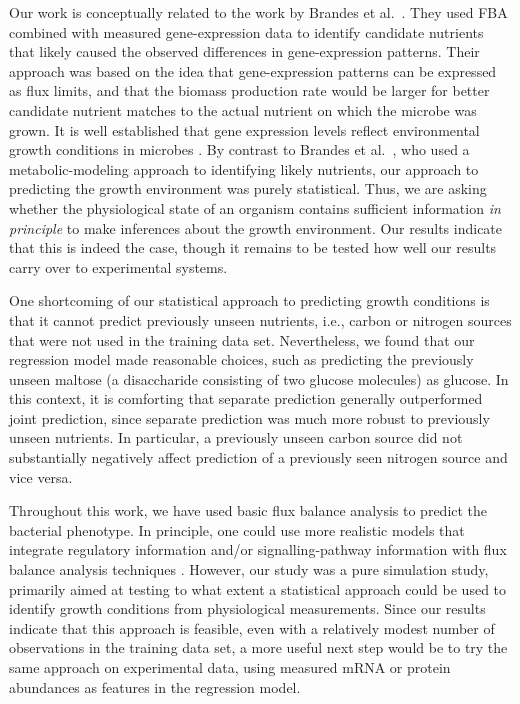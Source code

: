 \documentclass[12pt]{article}
\begin{document}
Our work is conceptually related to the work by Brandes et al.~\cite{Brandesetal2012}. They used FBA combined with measured gene-expression data to identify candidate nutrients that likely caused the observed differences in gene-expression patterns. Their approach was based on the idea that gene-expression patterns can be expressed as flux limits, and that the biomass production rate would be larger for better candidate nutrient matches to the actual nutrient on which the microbe was grown. It is well established that gene expression levels reflect environmental growth conditions in microbes \cite{Schnappingeretal2003,Baevetal2006}. By contrast to Brandes et al.~\cite{Brandesetal2012}, who used a metabolic-modeling approach to identifying likely nutrients, our approach to predicting the growth environment was purely statistical. Thus, we are asking whether the physiological state of an organism contains sufficient information \emph{in principle} to make inferences about the growth environment. Our results indicate that this is indeed the case, though it remains to be tested how well our results carry over to experimental systems.

One shortcoming of our statistical approach to predicting growth conditions is that it cannot predict previously unseen nutrients, i.e., carbon or nitrogen sources that were not used in the training data set. Nevertheless, we found that our regression model made reasonable choices, such as predicting the previously unseen maltose (a disaccharide consisting of two glucose molecules) as glucose. In this context, it is comforting that separate prediction generally outperformed joint prediction, since separate prediction was much more robust to previously unseen nutrients. In particular, a previously unseen carbon source did not substantially negatively affect prediction of a previously seen nitrogen source and vice versa.

Throughout this work, we have used basic flux balance analysis to predict the bacterial phenotype. In principle, one could use more realistic models that integrate regulatory information and/or signalling-pathway information with flux balance analysis techniques \cite{CovertPalsson2002,Covertetal2008}. However, our study was a pure simulation study, primarily aimed at testing to what extent a statistical approach could be used to identify growth conditions from physiological measurements. Since our results indicate that this approach is feasible, even with a relatively modest number of observations in the training data set, a more useful next step would be to try the same approach on experimental data, using measured mRNA or protein abundances as features in the regression model.
\end{document}
